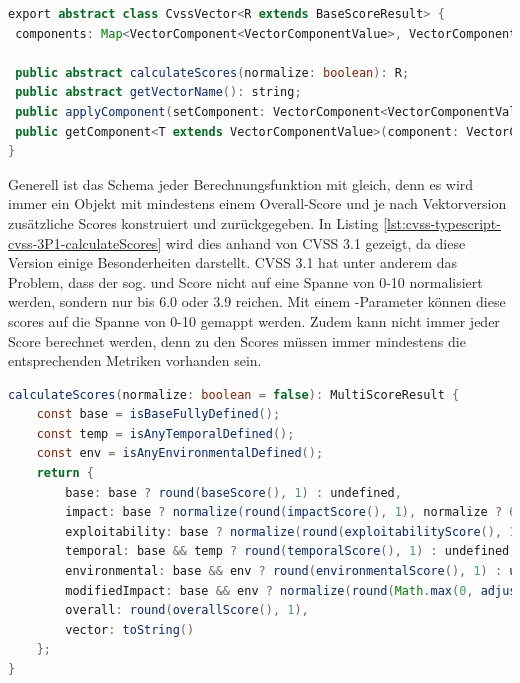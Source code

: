 \begin{lstlisting}[language=Java, label={lst:cvss-typescript-cvss-vector-class-attributes}, caption={CvssVector Klasse in TypeScript}]
export abstract class CvssVector<R extends BaseScoreResult> {
 components: Map<VectorComponent<VectorComponentValue>, VectorComponentValue>;

 public abstract calculateScores(normalize: boolean): R;
 public abstract getVectorName(): string;
 public applyComponent(setComponent: VectorComponent<VectorComponentValue>, setValue: VectorComponentValue) { ... }
 public getComponent<T extends VectorComponentValue>(component: VectorComponent<T>): T { ... }
}
\end{lstlisting}

Generell ist das Schema jeder Berechnungsfunktion mit  gleich, denn es wird immer ein Objekt mit mindestens einem Overall-Score und je nach Vektorversion zusätzliche Scores konstruiert und zurückgegeben.
In Listing \ref{lst:cvss-typescript-cvss-3P1-calculateScores} wird dies anhand von CVSS 3.1 gezeigt, da diese Version einige Besonderheiten darstellt.
CVSS 3.1 hat unter anderem das Problem, dass der sog.  und  Score nicht auf eine Spanne von 0-10 normalisiert werden, sondern nur bis 6.0 oder 3.9 reichen.
Mit einem -Parameter können diese scores auf die Spanne von 0-10 gemappt werden.
Zudem kann nicht immer jeder Score berechnet werden, denn zu den Scores müssen immer mindestens die entsprechenden Metriken vorhanden sein.

\begin{lstlisting}[language=Java, label={lst:cvss-typescript-cvss-3P1-calculateScores}, caption={CVSS 3.1 Score-Berechnung in TypeScript}]
calculateScores(normalize: boolean = false): MultiScoreResult {
    const base = isBaseFullyDefined();
    const temp = isAnyTemporalDefined();
    const env = isAnyEnvironmentalDefined();
    return {
        base: base ? round(baseScore(), 1) : undefined,
        impact: base ? normalize(round(impactScore(), 1), normalize ? 6.0 : 10) : undefined,
        exploitability: base ? normalize(round(exploitabilityScore(), 1), normalize ? 3.9 : 10) : undefined,
        temporal: base && temp ? round(temporalScore(), 1) : undefined,
        environmental: base && env ? round(environmentalScore(), 1) : undefined,
        modifiedImpact: base && env ? normalize(round(Math.max(0, adjustedImpactScore()), 1), normalize ? 6.1 : 10) : undefined,
        overall: round(overallScore(), 1),
        vector: toString()
    };
}
\end{lstlisting}

